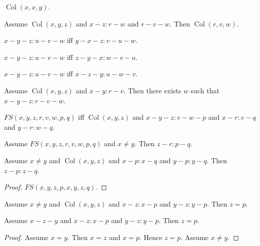 \documentclass{article}
\newcommand{\Col}[3]{\operatorname{Col}(#1, #2, #3)}
\begin{document}
\begin{forthel}
    \begin{lemma}[L4o12]
      $\Col{x}{x}{y}$.
    \end{lemma}

    \begin{lemma}[L4o13]
      Assume $\Col{x}{y}{z}$ and $x-z : r-w$ and $r-v-w$. Then $\Col{r}{v}{w}$.
    \end{lemma}

    \begin{lemma}[L4o14o1]
      $x-y-z : u-v-w$ iff $y-x-z : v-u-w$.
    \end{lemma}

    \begin{lemma}[L4o14o2]
      $x-y-z : u-v-w$ iff $z-y-x : w-v-u$.
    \end{lemma}

    \begin{lemma}[L4o14o3]
      $x-y-z : u-v-w$ iff $x-z-y : u-w-v$.
    \end{lemma}

    \begin{axiom}[L4o14]
      Assume $\Col{x}{y}{z}$ and $x-y : r-v$. Then there exists $w$ such that $x-y-z : r-v-w$.
    \end{axiom}

    \begin{definition}[L4o15]
      $FS(x,y,z,r,v,w,p,q)$ iff $\Col{x}{y}{z}$ and $x-y-z : v-w-p$ and $x-r : v-q$ and $y-r : w-q$.
    \end{definition}

    \begin{axiom}[L4o16]
      Assume $FS(x,y,z,r,v,w,p,q)$ and $x \neq y$. Then $z-r : p-q$.
    \end{axiom}


    \begin{lemma}[L4o17]
      Assume $x \neq y$ and $\Col{x}{y}{z}$ and $x-p : x-q$ and $y-p : y-q$. Then $z-p : z-q$.
    \end{lemma}
    \begin{proof}
    	$FS(x,y,z,p,x,y,z,q)$.
    \end{proof}


    \begin{lemma}[L4o18]
      Assume $x \neq y$ and $\Col{x}{y}{z}$ and $x-z : x-p$ and $y-z : y-p$. Then $z = p$.
    \end{lemma}

    \begin{lemma}[L4o19]
      Assume $x-z-y$ and $x-z : x-p$ and $y-z : y-p$. Then $z = p$.
    \end{lemma}
    \begin{proof}
      Assume $x = y$. Then $x = z$ and $x = p$. Hence $z = p$. Assume $x \neq y$.
    \end{proof}
  \end{forthel}
\end{document}
